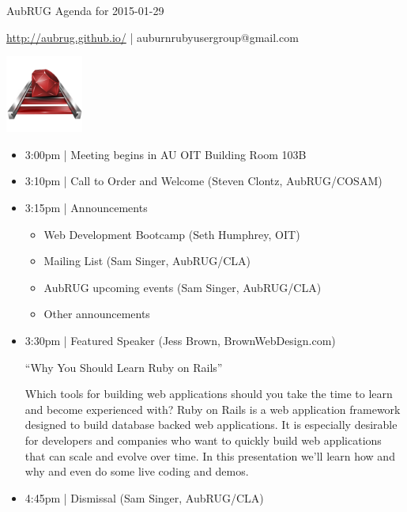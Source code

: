 \documentclass{article}
\begin{document}
\begin{center}
  {\huge AubRUG Agenda for 2015-01-29}

  \url{http://aubrug.github.io/} | auburnrubyusergroup@gmail.com

  \includegraphics[width=1in,height=1in]{ruby-on-rails-logo.png}
\end{center}

\begin{itemize}
  \item 3:00pm | Meeting begins in AU OIT Building Room 103B
  \item 3:10pm | Call to Order and Welcome (Steven Clontz, AubRUG/COSAM)
  \item 3:15pm | Announcements
    \begin{itemize}
      \item Web Development Bootcamp (Seth Humphrey, OIT)
      \item Mailing List (Sam Singer, AubRUG/CLA)
      \item AubRUG upcoming events (Sam Singer, AubRUG/CLA)
      \item Other announcements
    \end{itemize}
  \item 3:30pm | Featured Speaker (Jess Brown, BrownWebDesign.com)

        ``Why You Should Learn Ruby on Rails''

          {\small
          Which tools for building web applications should you take the
          time to learn and become experienced with? Ruby on Rails is a web
          application framework designed to build database backed
          web applications. It is especially desirable for developers and
          companies who want to quickly build web applications that can scale
          and evolve over time. In this presentation we'll learn how and why
          and even do some live coding and demos.
          }

  \item 4:45pm | Dismissal (Sam Singer, AubRUG/CLA)
\end{itemize}
\end{document}
